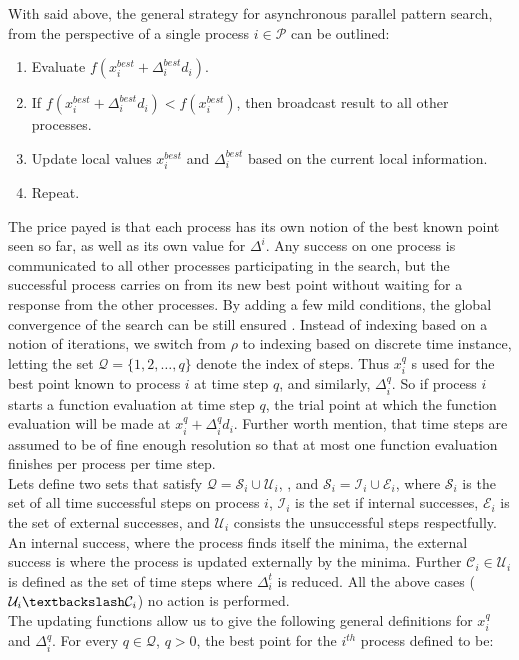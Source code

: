  With said above, the general strategy for asynchronous parallel pattern search, from the perspective of a single process $i\in\mathcal{P}$ can be outlined:
		\begin{enumerate}
		\item Evaluate $f(x^{best}_i+\Delta^{best}_id_i)$.
		\item If $f(x^{best}_i+\Delta^{best}_id_i) <f(x^{best}_i)$, then broadcast result to all other processes.
		\item Update local values $x^{best}_i$ and $\Delta^{best}_i$ based on the current local information.
		\item Repeat.
		\end{enumerate}
	The price payed is that each process has its own notion of the best known point seen so far, as well as its own value for	$\Delta^i$. Any success on one process is communicated to all other processes participating in the search, but the successful process carries on from its new best point without waiting for a response from the other processes. By adding a few mild conditions, the global convergence of the search can be still ensured \cite{kolda2003understanding}.  Instead of indexing based on a notion of iterations, we switch from $\rho$ to indexing based on discrete time instance, letting the set $\mathcal{Q}=\{1,2,\dots,q\}$ denote the index of steps. Thus $x_i^q$ s used for the best point known to process $i$ at time step $q$, and similarly, $\Delta_i^q$.  So if process $i$ starts a function evaluation at time step $q$, the trial point at which the function evaluation will be made at $x^{q}_i+\Delta^{q}_id_i$. Further worth mention, that time steps are assumed to be of fine enough resolution so that at most one function evaluation finishes per process per time step.\\
	Lets define two sets that satisfy $\mathcal{Q}=\mathcal{S}_i\cup\mathcal{U}_i$, , and $\mathcal{S}_i=\mathcal{I}_i\cup\mathcal{E}_i$, where $\mathcal{S}_i$ is the set of all time successful steps on process $i$, $\mathcal{I}_i$ is the set if internal successes, $\mathcal{E}_i$ is the set of external successes,   and $\mathcal{U}_i$ consists the unsuccessful steps respectfully. An internal success, where the process finds itself the minima, the external success is where the process is updated externally by the minima. Further  $\mathcal{C}_i\in\mathcal{U}_i$ is defined as the set of time steps where $\Delta^t_i$ is reduced. All the above cases ($\mathcal{U}_i\textbackslash\mathcal{C}_i$) no action is performed.\\
	The updating functions allow us to give the following general definitions for $x_i^q$ and $\Delta^q_i$. For every $q\in\mathcal{Q}$, $q>0$, the best point for the $i^{th}$ process defined to be:
	
